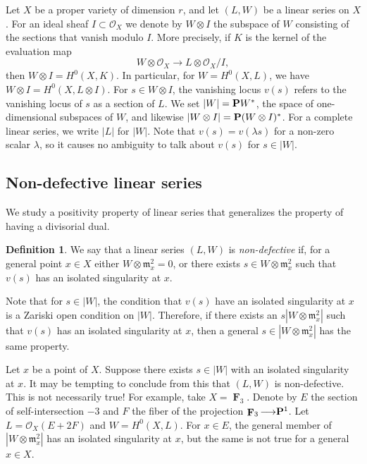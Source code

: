 \documentclass[11pt,reqno]{amsart}
\theoremstyle{plain}
\theoremstyle{definition}
\newtheorem{definition}[theorem]{Definition}
\theoremstyle{remark}
\numberwithin{equation}{section}
\DeclareMathOperator{\F}{\mathbf F}
\renewcommand{\to}{{\longrightarrow}}
\numberwithin{equation}{section}
\renewcommand{\O}{\mathcal O}
\begin{document}
Let $X$ be a proper variety of dimension $r$, and let $(L, W)$ be a linear series on $X$.
For an ideal sheaf $I \subset \O_X$ we denote by $W \otimes I$ the subspace of $W$ consisting of the sections that vanish modulo $I$. %
More precisely, if $K$ is the kernel of the evaluation map
\[ W \otimes \O_X \to L \otimes \O_X/I,\]
then $W \otimes I = H^0(X, K)$.
In particular, for $W = H^0(X, L)$, we have $W \otimes I = H^0(X, L \otimes I)$.
For $s \in W \otimes I$, the vanishing locus $v(s)$ refers to the vanishing locus of $s$ as a section of $L$.
We set $|W| = \P W^*$, the space of one-dimensional subspaces of $W$, and likewise $|W \otimes I| = \P (W \otimes I)^*$.
For a complete linear series, we write $|L|$ for $|W|$.
Note that $v(s) = v(\lambda s)$ for a non-zero scalar $\lambda$, so it causes no ambiguity to talk about $v(s)$ for $s \in |W|$.

\subsection{Non-defective linear series}\label{sec:non-defectivity}
We study a positivity property of linear series that generalizes the property of having a divisorial dual.
\begin{definition}
  \label{definition:Genericallynon-defective} 
  We say that a linear series $(L, W)$ is \emph{non-defective} if,  for a general point $x \in X$ either $W \otimes \mathfrak m_x^2 = 0$, or there exists $s \in W \otimes \mathfrak m_x^2$ such that $v(s)$ has an isolated singularity at $x$.
\end{definition}
Note that for $s \in |W|$, the condition that $v(s)$ have an isolated singularity at $x$ is a Zariski open condition on $|W|$.
Therefore, if there exists an $s |W \otimes \mathfrak m_x^2|$ such that $v(s)$ has an isolated singularity at $x$, then a general $s \in |W \otimes \mathfrak m_x^2|$ has the same property.
\begin{remark}
  Let $x$ be a point of $X$.
  Suppose there exists $s \in |W|$ with an isolated singularity at $x$.
  It may be tempting to conclude from this that $(L, W)$ is non-defective.
  This is not necessarily true!
  For example, take $X = \F_3$.
  Denote by $E$ the section of self-intersection $-3$ and $F$ the fiber of the projection $\F_3 \to \P^1$.
  Let $L = \O_X(E + 2F)$ and $W = H^0(X, L)$.
  For $x \in E$, the general member of $|W \otimes \mathfrak m_x^2|$ has an isolated singularity at $x$, but the same is not true for a general $x \in X$.
\end{remark}
\end{document}
